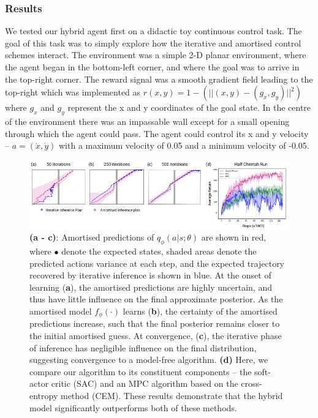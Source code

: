 \subsubsection{Results}

We tested our hybrid agent first on a didactic toy continuous control task. The goal of this task was to simply explore how the iterative and amortised control schemes interact. The environment was a simple 2-D planar environment, where the agent began in the bottom-left corner, and where the goal was to arrive in the top-right corner. The reward signal was a smooth gradient field leading to the top-right which was implemented as $r(x,y) = 1 - (|| (x,y) - (g_x, g_y) ||^2)$ where $g_x$ and $g_y$ represent the x and y coordinates of the goal state. In the centre of the environment there was an impassable wall except for a small opening through which the agent could pass. The agent could control its x and y velocity -- $a = (\dot{x}, \dot{y})$ with a maximum velocity of 0.05 and a minimum velocity of -0.05.

\begin{figure}[t!]
  \centering
  \includegraphics[width=\textwidth]{chapter_4_figures/CHI_figure_one_edit.pdf}
  \caption{\textbf{(a - c)}: Amortised predictions of $q_{\phi}(a|s; \theta)$ are shown in red, where $\bullet$ denote the expected states, shaded areas denote the predicted actions variance at each step, and the expected trajectory recovered by iterative inference is shown in blue.
  At the onset of learning (\textbf{a}), the amortised predictions are highly uncertain, and thus have little influence on the final approximate posterior. As the amortised model $f_{\phi}(\cdot)$ learns (\textbf{b}), the certainty of the amortised predictions increase, such that the final posterior remains closer to the initial amortised guess. At convergence, (\textbf{c}), the iterative phase of inference has negligible influence on the final distribution, suggesting convergence to a model-free algorithm. \textbf{(d)} Here, we compare our algorithm to its constituent components -- the soft-actor critic (SAC) and an MPC algorithm based on the cross-entropy method (CEM). These results demonstrate that the hybrid model significantly outperforms both of these methods.}
\label{hybrid_performance_figure}
\end{figure}

